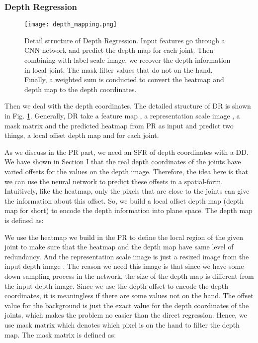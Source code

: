 \documentclass[journal]{IEEEtran}
\begin{document}
\subsubsection{Depth Regression}

\begin{figure}[!t]
  \centering
  \texttt{[image: depth\_mapping.png]}
  \caption{Detail structure of Depth Regression. 
  Input features go through a CNN network and predict the depth map for each joint. 
  Then combining with label scale image, we recover the depth information in local joint. 
  The mask filter values that do not on the hand. 
  Finally, a weighted sum is conducted to convert the heatmap and depth map to the depth coordinates.
  }
  \label{DR}
\end{figure}

Then we deal with the depth coordinates. 
The detailed structure of DR is shown in Fig\@. \ref{DR}. 
Generally, DR take a feature map , 
a representation scale image  , 
a mask matrix  and the predicted heatmap  from PR as input and predict two things, 
a local offset depth map  and  for each joint. 

As we discuss in the PR part, we need an SFR of depth coordinates with a DD. 
We have shown in Section I that the real depth coordinates of the joints have varied offsets for the values on the depth image. 
Therefore, the idea here is that we can use the neural network to predict these offsets in a spatial-form. 
Intuitively, like the heatmap, only the pixels that are close to the joints can give the information about this offset. 
So, we build a local offset depth map (depth map for short) to encode the depth information into plane space. 
The depth map is defined as:



We use the heatmap we build in the PR to define the local region of the given joint to make sure that the heatmap and the depth map have same level of redundancy. 
And the representation scale image  is just a resized image from the input depth image . 
The reason we need this image is that since we have some down sampling process in the network, the size of the depth map is different from the input depth image. 
Since we use the depth offset to encode the depth coordinates, it is meaningless if there are some values not on the hand. 
The offset value for the background is just the exact value for the depth coordinates of the joints, which makes the problem no easier than the direct regression. 
Hence, we use mask matrix  which denotes which pixel is on the hand to filter the depth map. 
The mask matrix  is defined as:
\end{document}
